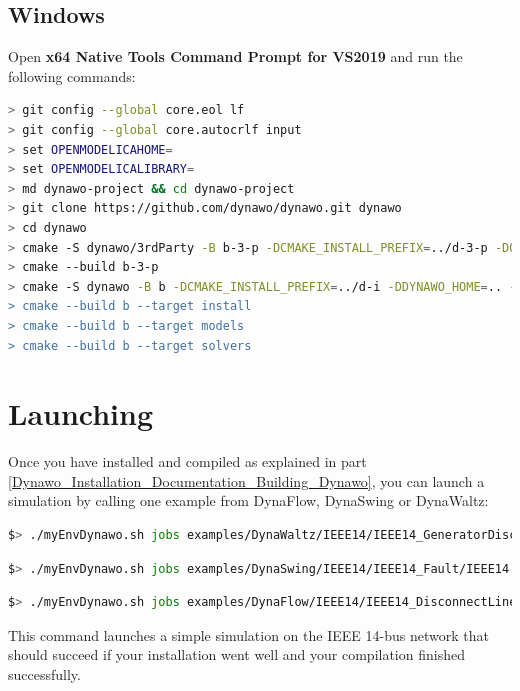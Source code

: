 \documentclass[a4paper, 12pt]{report}
\begin{document}
\subsection{Windows}
Open \textbf{x64 Native Tools Command Prompt for VS2019} and run the following commands:
\begin{lstlisting}[language=bash]
> git config --global core.eol lf
> git config --global core.autocrlf input
> set OPENMODELICAHOME=
> set OPENMODELICALIBRARY=
> md dynawo-project && cd dynawo-project
> git clone https://github.com/dynawo/dynawo.git dynawo
> cd dynawo
> cmake -S dynawo/3rdParty -B b-3-p -DCMAKE_INSTALL_PREFIX=../d-3-p -DOPENMODELICA_INSTALL=../OpenModelica/Install -DOPENMODELICA_SRC=../OpenModelica/Source -DOMDEV_HOME=../OMDev -G "NMake Makefiles"
> cmake --build b-3-p
> cmake -S dynawo -B b -DCMAKE_INSTALL_PREFIX=../d-i -DDYNAWO_HOME=.. -DINSTALL_OPENMODELICA=../../OpenModelica/Install -DDYNAWO_THIRD_PARTY_DIR=../../d-3-p -G "NMake Makefiles
> cmake --build b --target install
> cmake --build b --target models
> cmake --build b --target solvers
\end{lstlisting}

\section[Launching Dynawo]{Launching \Dynawo}

Once you have installed and compiled \Dynawo as explained in part \ref{Dynawo_Installation_Documentation_Building_Dynawo}, you can launch a simulation by calling one example from DynaFlow, DynaSwing or DynaWaltz:

\begin{lstlisting}[language=bash, breaklines=true, breakatwhitespace=false]
$> ./myEnvDynawo.sh jobs examples/DynaWaltz/IEEE14/IEEE14_GeneratorDisconnections/IEEE14.jobs
\end{lstlisting}

\begin{lstlisting}[language=bash, breaklines=true, breakatwhitespace=false]
$> ./myEnvDynawo.sh jobs examples/DynaSwing/IEEE14/IEEE14_Fault/IEEE14.jobs
\end{lstlisting}

\begin{lstlisting}[language=bash, breaklines=true, breakatwhitespace=false]
$> ./myEnvDynawo.sh jobs examples/DynaFlow/IEEE14/IEEE14_DisconnectLine/IEEE14.jobs
\end{lstlisting}

This command launches a simple simulation on the IEEE 14-bus network that should succeed if your installation went well and your compilation finished successfully.
\end{document}
